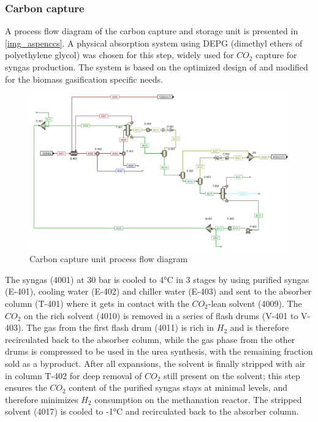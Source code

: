 \documentclass[a4paper, titlepage]{article}
\begin{document}
\subsubsection{Carbon capture}

A process flow diagram of the carbon capture and storage unit is presented in \autoref{img_aspenccs}.
A physical absorption system using DEPG (dimethyl ethers of polyethylene glycol) was chosen for this step, widely
used for $CO_2$ capture for syngas production. The system is based on the optimized design
of \textcite{martelliMultiobjectiveOptimizationSelexol2015} and modified for the biomass gasification specific needs.

\begin{figure}[htb]
    \includegraphics[width=\textwidth]{img/aspen_ccs.png}
    \caption{Carbon capture unit process flow diagram}
    \label{img_aspenccs}
\end{figure}

The syngas (4001) at 30 bar is cooled to 4°C in 3 stages by using purified syngas (E-401), cooling water (E-402) and
chiller water (E-403) and sent to the absorber column (T-401) where it gets in contact with the $CO_2$-lean
solvent (4009). The $CO_2$ on the rich solvent (4010) is removed in a series of flash drums (V-401 to V-403).
The gas from the first flash drum (4011) is rich in $H_2$ and is therefore recirculated back to the absorber column,
while the gas phase from the other drums is compressed to be used in the urea synthesis, with the remaining fraction sold as a byproduct. After all expansions, the solvent is finally stripped with air \cite{mokhatabNaturalGasSweetening2012}
in column T-402 for deep removal of $CO_2$ still present on the solvent; this step ensures the $CO_2$ content of the
purified syngas stays at minimal levels, and therefore minimizes $H_2$ consumption on the methanation reactor.
The stripped solvent (4017) is cooled to -1°C and recirculated back to the absorber column.
\end{document}
